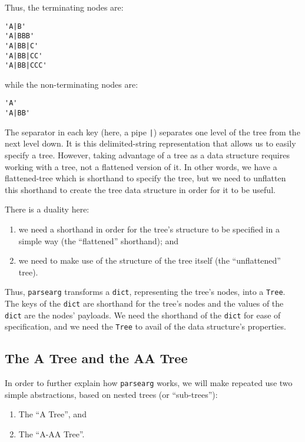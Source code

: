 \documentclass[10pt]{amsart}
\numberwithin{equation}{section}
\begin{document}
Thus, the terminating nodes are:
\begin{verbatim}
'A|B'
'A|BBB'
'A|BB|C'
'A|BB|CC'
'A|BB|CCC'
\end{verbatim}

while the non-terminating nodes are:
\begin{verbatim}
'A'
'A|BB'
\end{verbatim}

The separator in each key (here, a pipe \texttt{|}) separates one level of the tree
from the next level down. It is this delimited-string representation that 
allows us to easily specify a tree. However, taking advantage of 
a tree as a data structure requires working with a tree, not a flattened
version of it. In other words, we have a 
flattened-tree which is shorthand to specify the tree, but we need 
to unflatten this shorthand to create the tree data structure in order 
for it to be useful. 

There is a duality here:

\begin{enumerate}
\item we need a shorthand in order for the 
tree's structure to be specified in a simple way 
(the ``flattened'' shorthand); and

\item we need to make use of the structure of the tree itself 
(the ``unflattened'' tree).
\end{enumerate}

Thus, \texttt{parsearg} transforms a \texttt{dict}, representing the tree's nodes, into
a \texttt{Tree}.  The keys of the \texttt{dict} are shorthand for the tree's nodes and
the values of the \texttt{dict} are the nodes' payloads.  We need the shorthand
of the \texttt{dict} for ease of specification, and we need the \texttt{Tree} to avail of
the data structure's properties.


\subsection{The A Tree and the AA Tree}
\label{sec:org69e6e50}
In order to further explain how \texttt{parsearg} works, we will make repeated
use two simple abstractions, based on nested trees (or ``sub-trees''):

\begin{enumerate}
\item The ``A Tree'', and
\item The ``A-AA Tree''.
\end{enumerate}
\end{document}
